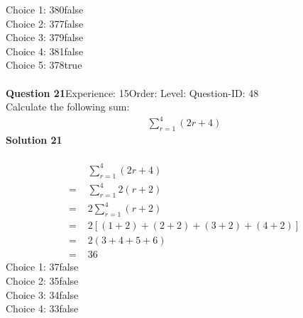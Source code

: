 \documentclass{article}
\begin{document}
Choice 1: \hspace{20pt}380\hspace{20pt}false\\
Choice 2: \hspace{20pt}377\hspace{20pt}false\\
Choice 3: \hspace{20pt}379\hspace{20pt}false\\
Choice 4: \hspace{20pt}381\hspace{20pt}false\\
Choice 5: \hspace{20pt}378\hspace{20pt}true\\
\\[4pt]
\noindent\textbf{Question 21}\hspace{20pt}Experience: 15\hspace{20pt}Order: \hspace{20pt}Level: \hspace{20pt}Question-ID: 48\\[2pt]
Calculate the following sum:
\begin{align*}
\sum_{r=1}^{4} (2r+4)
\end{align*}
\noindent\textbf{Solution 21}\\[2pt]
\\[-35pt]\begin{align*}
&\sum_{r=1}^{4} (2r+4)\\[2pt]
=\,\,&\sum_{r=1}^{4} 2(r+2)\\[2pt]
=\,\,&2\sum_{r=1}^{4} (r+2)\\[2pt]
=\,\,&2[(1+2)+(2+2)+(3+2)+(4+2)]\\[2pt]
=\,\,&2(3+4+5+6)\\[2pt]
=\,\,&36
\end{align*}
Choice 1: \hspace{20pt}37\hspace{20pt}false\\
Choice 2: \hspace{20pt}35\hspace{20pt}false\\
Choice 3: \hspace{20pt}34\hspace{20pt}false\\
Choice 4: \hspace{20pt}33\hspace{20pt}false\\
\end{document}
